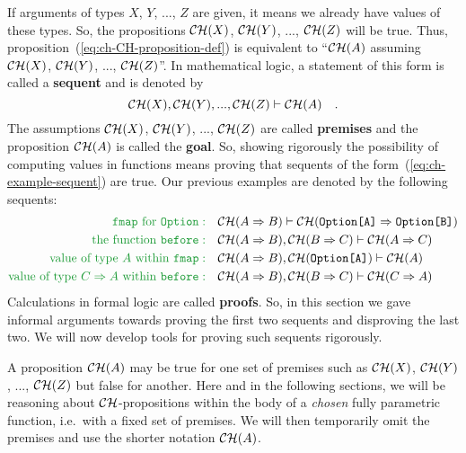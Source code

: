 If arguments of types $X$, $Y$, ..., $Z$ are given, it means we
already have values of these types. So, the propositions ${\cal CH}(X)$,
${\cal CH}(Y)$, ..., ${\cal CH}(Z)$ will be true. Thus, proposition~(\ref{eq:ch-CH-proposition-def})
is equivalent to ``${\cal CH}(A)$ assuming ${\cal CH}(X)$, ${\cal CH}(Y)$,
..., ${\cal CH}(Z)$''. In mathematical logic, a statement of this
form is called a \textbf{sequent} and is denoted
by
\begin{equation}
{\cal CH}(X),{\cal CH}(Y),...,{\cal CH}(Z)\vdash{\cal CH}(A)\quad.\label{eq:ch-example-sequent}
\end{equation}
The assumptions ${\cal CH}(X)$, ${\cal CH}(Y)$, ..., ${\cal CH}(Z)$
are called \textbf{premises} and the proposition
${\cal CH}(A)$ is called the \textbf{goal}.
So, showing rigorously the possibility of computing values in functions
means proving that sequents of the form~(\ref{eq:ch-example-sequent})
are true. Our previous examples are denoted by the following sequents:
\begin{align*}
{\color{greenunder}\text{\texttt{fmap} for \texttt{Option}}:}\quad & {\cal CH}(A\Rightarrow B)\vdash{\cal CH}(\text{\texttt{Option[A]}}\Rightarrow\text{\texttt{Option[B]}})\\
{\color{greenunder}\text{the function \texttt{before}}:}\quad & {\cal CH}(A\Rightarrow B),{\cal CH}(B\Rightarrow C)\vdash{\cal CH}(A\Rightarrow C)\\
{\color{greenunder}\text{value of type }A\text{ within \texttt{fmap}}:}\quad & {\cal CH}(A\Rightarrow B),{\cal CH}(\text{\texttt{Option[A]}})\vdash{\cal CH}(A)\\
{\color{greenunder}\text{value of type }C\Rightarrow A\text{ within \texttt{before}}:}\quad & {\cal CH}(A\Rightarrow B),{\cal CH}(B\Rightarrow C)\vdash{\cal CH}(C\Rightarrow A)
\end{align*}
Calculations in formal logic are called \textbf{proofs}.
So, in this section we gave informal arguments towards proving the
first two sequents and disproving the last two. We will now develop
tools for proving such sequents rigorously.

A proposition ${\cal CH}(A)$ may be true for one set of premises
such as ${\cal CH}(X)$, ${\cal CH}(Y)$, ..., ${\cal CH}(Z)$ but
false for another. Here and in the following sections, we will be
reasoning about ${\cal CH}$-propositions within the body of a \emph{chosen}
fully parametric function, i.e.~with a fixed set of premises. We
will then temporarily omit the premises and use the shorter notation
${\cal CH}(A)$.


